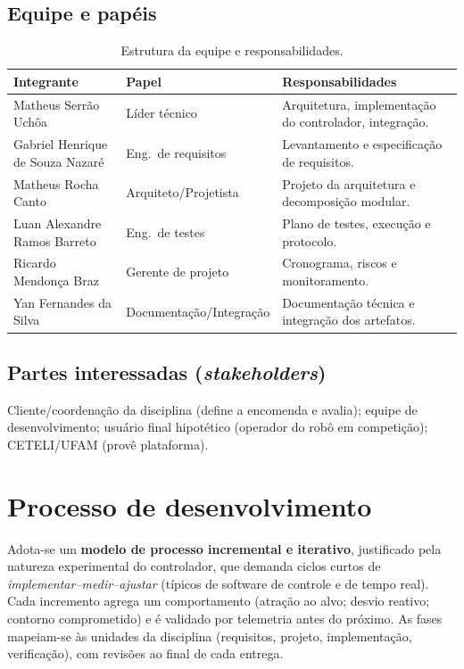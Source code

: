 \subsection{Equipe e papéis}
\begin{table}[H]\centering
\caption{Estrutura da equipe e responsabilidades.}
\begin{tabularx}{\textwidth}{@{}l l X@{}}
\toprule
\textbf{Integrante} & \textbf{Papel} & \textbf{Responsabilidades} \\
\midrule
Matheus Serrão Uchôa & Líder técnico & Arquitetura, implementação do controlador, integração. \\
Gabriel Henrique de Souza Nazaré & Eng.\ de requisitos & Levantamento e especificação de requisitos. \\
Matheus Rocha Canto & Arquiteto/Projetista & Projeto da arquitetura e decomposição modular. \\
Luan Alexandre Ramos Barreto & Eng.\ de testes & Plano de testes, execução e protocolo. \\
Ricardo Mendonça Braz & Gerente de projeto & Cronograma, riscos e monitoramento. \\
Yan Fernandes da Silva & Documentação/Integração & Documentação técnica e integração dos artefatos. \\
\bottomrule
\end{tabularx}
\end{table}

\subsection{Partes interessadas (\emph{stakeholders})}
Cliente/coordenação da disciplina (define a encomenda e avalia); equipe de desenvolvimento; usuário final hipotético (operador do robô em competição); CETELI/UFAM (provê plataforma).

\section{Processo de desenvolvimento}
Adota-se um \textbf{modelo de processo incremental e iterativo}, justificado pela natureza experimental do controlador, que demanda ciclos curtos de \emph{implementar--medir--ajustar} (típicos de software de controle e de tempo real). Cada incremento agrega um comportamento (atração ao alvo; desvio reativo; contorno comprometido) e é validado por telemetria antes do próximo. As fases mapeiam-se às unidades da disciplina (requisitos, projeto, implementação, verificação), com revisões ao final de cada entrega.

